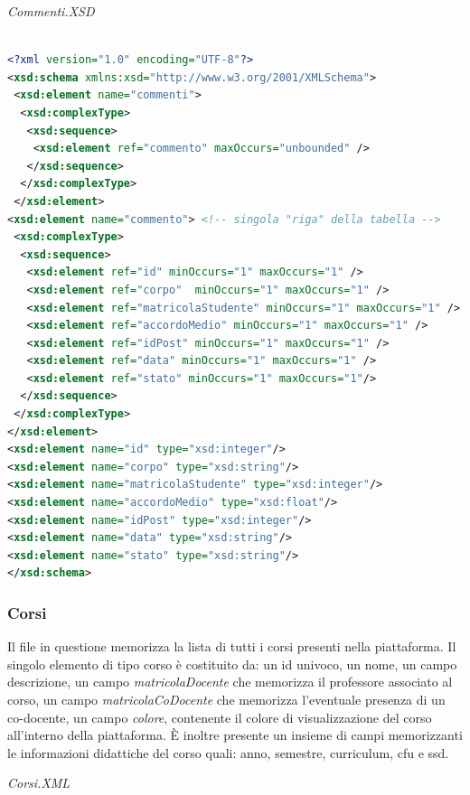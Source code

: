 \documentclass [a4paper,11pt]{book}
\begin{document}
\medskip

\emph{Commenti.XSD}

\begin{lstlisting}[language=XML]

<?xml version="1.0" encoding="UTF-8"?>
<xsd:schema xmlns:xsd="http://www.w3.org/2001/XMLSchema">
 <xsd:element name="commenti">
  <xsd:complexType>
   <xsd:sequence>
    <xsd:element ref="commento" maxOccurs="unbounded" />
   </xsd:sequence>
  </xsd:complexType>
 </xsd:element>
<xsd:element name="commento"> <!-- singola "riga" della tabella -->
 <xsd:complexType>
  <xsd:sequence>
   <xsd:element ref="id" minOccurs="1" maxOccurs="1" />
   <xsd:element ref="corpo"  minOccurs="1" maxOccurs="1" />
   <xsd:element ref="matricolaStudente" minOccurs="1" maxOccurs="1" />
   <xsd:element ref="accordoMedio" minOccurs="1" maxOccurs="1" />
   <xsd:element ref="idPost" minOccurs="1" maxOccurs="1" />
   <xsd:element ref="data" minOccurs="1" maxOccurs="1" />
   <xsd:element ref="stato" minOccurs="1" maxOccurs="1"/>
  </xsd:sequence>   
 </xsd:complexType>
</xsd:element>
<xsd:element name="id" type="xsd:integer"/>
<xsd:element name="corpo" type="xsd:string"/>
<xsd:element name="matricolaStudente" type="xsd:integer"/>
<xsd:element name="accordoMedio" type="xsd:float"/>
<xsd:element name="idPost" type="xsd:integer"/>
<xsd:element name="data" type="xsd:string"/>
<xsd:element name="stato" type="xsd:string"/>
</xsd:schema>
\end{lstlisting}

\medskip

\subsubsection{Corsi}

Il file in questione memorizza la lista di tutti i corsi presenti nella piattaforma. Il singolo elemento di tipo corso è costituito da: un id univoco, un nome, un campo descrizione, un campo \emph{matricolaDocente} che memorizza il professore associato al corso, un campo \emph{matricolaCoDocente} che memorizza l'eventuale presenza di un co-docente, un campo \emph{colore}, contenente il colore di visualizzazione del corso all'interno della piattaforma. È inoltre presente un insieme di campi memorizzanti le informazioni didattiche del corso quali: anno, semestre, curriculum, cfu e ssd.

\medskip

\emph{Corsi.XML}

\label{sec:corsi}
\end{document}

